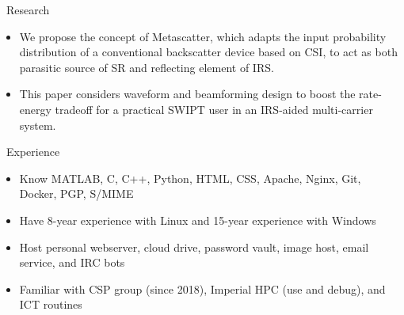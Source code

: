 \documentclass{resume}
\begin{document}
\begin{section}{\faPaperPlane\ Research}
	\begin{itemize}
		\item We propose the concept of Metascatter, which adapts the input probability distribution of a conventional backscatter device based on CSI, to act as both parasitic source of SR and reflecting element of IRS.
	\end{itemize}
	\begin{itemize}
		\item This paper considers waveform and beamforming design to boost the rate-energy tradeoff for a practical SWIPT user in an IRS-aided multi-carrier system.
	\end{itemize}
\end{section}

\begin{section}{\faTasks\ Experience}
	\begin{itemize}[itemsep=0pt, topsep=5pt, parsep=3pt, partopsep=0pt]
		\item Know MATLAB, C, C++, Python, HTML, CSS, Apache, Nginx, Git, Docker, PGP, S/MIME
		\item Have 8-year experience with Linux and 15-year experience with Windows
		\item Host personal webserver, cloud drive, password vault, image host, email service, and IRC bots
		\item Familiar with CSP group (since 2018), Imperial HPC (use and debug), and ICT routines
	\end{itemize}
\end{section}

\end{document}

